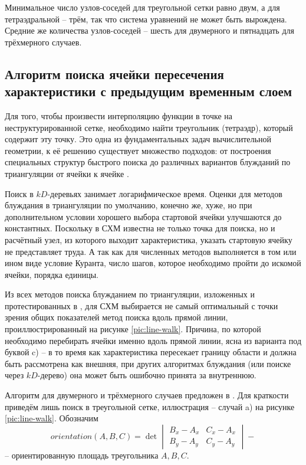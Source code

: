 Минимальное число узлов-соседей для треугольной сетки равно двум, а для тетраэдральной -- трём, 
так что система уравнений не может быть вырождена. Средние же количества узлов-соседей -- 
шесть для двумерного и пятнадцать для трёхмерного случаев.


\subsection{Алгоритм поиска ячейки пересечения характеристики с предыдущим временным слоем}
Для того, чтобы произвести интерполяцию функции в точке на неструктурированной сетке, 
необходимо найти треугольник (тетраэдр), который содержит эту точку. Это одна из 
фундаментальных задач вычислительной геометрии, к её решению существует множество 
подходов: от построения специальных структур быстрого поиска 
до различных вариантов блужданий по триангуляции от ячейки к ячейке \cite{line_walker}. 

Поиск в $kD$-деревьях занимает логарифмическое время. 
Оценки для методов блуждания в триангуляции по умолчанию, конечно же, хуже, 
но при дополнительном условии хорошего выбора стартовой ячейки улучшаются до константных. 
Поскольку в СХМ известна не только точка для поиска, но и расчётный узел, 
из которого выходит характеристика, указать стартовую ячейку не представляет труда. 
А так как для численных методов выполняется в том или ином виде условие Куранта, 
число шагов, которое необходимо пройти до искомой ячейки, порядка единицы. 

Из всех методов поиска блужданием по триангуляции, изложенных и протестированных 
в \cite{line_walker}, для СХМ выбирается не самый оптимальный с точки зрения общих 
показателей метод поиска вдоль прямой линии, 
проиллюстрированный на рисунке \ref{pic:line-walk}. Причина, по которой 
необходимо перебирать ячейки именно вдоль прямой линии, 
ясна из варианта под буквой c) -- в то время как характеристика пересекает 
границу области и должна быть рассмотрена как внешняя, при других алгоритмах 
блуждания (или поиске через $kD$-дерево) она может быть ошибочно принята за внутреннюю. 

Алгоритм для двумерного и трёхмерного случаев предложен в \cite{line_walker}. 
Для краткости приведём лишь поиск в треугольной сетке, иллюстрация -- 
случай a) на рисунке \ref{pic:line-walk}. Обозначим 
\begin{equation}
orientation(A, B, C) = \det{\begin{vmatrix}B_x - A_x & C_x - A_x \\
                                           B_y - A_y & C_y - A_y \end{vmatrix}} -
\end{equation}
-- ориентированную площадь треугольника $A, B, C$.

